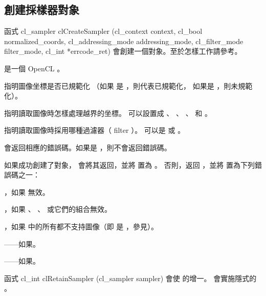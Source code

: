 \subsection{創建採樣器對象}

函式
\startclc
cl_sampler clCreateSampler (cl_context context,
			cl_bool normalized_coords,
			cl_addressing_mode addressing_mode,
			cl_filter_mode filter_mode,
			cl_int *errcode_ret)
\stopclc
會創建一個對象。至於怎樣工作請參考。

 是一個 OpenCL 。

 指明圖像坐標是否已規範化
（如果  是 ，則代表已規範化，
如果是 ，則未規範化）。

 指明讀取圖像時怎樣處理越界的坐標。
可以設置成 、 、
 、  和 。

 指明讀取圖像時採用哪種過濾器（ filter ）。
可以是  或 。

 會返回相應的錯誤碼。如果是 ，則不會返回錯誤碼。

如果成功創建了對象，  會將其返回，並將  置為 。
否則，返回 ，並將  置為下列錯誤碼之一：
\startigBase
\item {}，如果  無效。

\item {}，如果 、 、  或它們的組合無效。

\item {}，如果  中的所有都不支持圖像（即  是 ，參見）。

\item {}——如果\scdevfailres。

\item {}——如果\schostfailres。
\stopigBase

函式
\startclc
cl_int clRetainSampler (cl_sampler sampler)
\stopclc
會使  的增一。
 會實施隱式的 。

